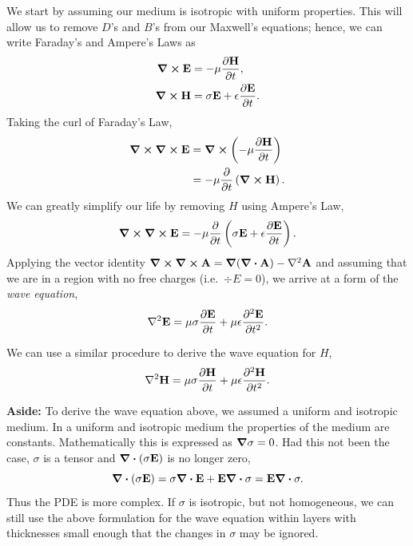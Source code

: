 We start by assuming our medium is isotropic with uniform properties.  This will
allow us to remove $D$'s and $B$'s from our Maxwell's equations; hence, we can
write Faraday's and Ampere's Laws as
\begin{align}
    \curl \vb{E} & = -\mu \pdv{\vb{H}}{t}, \\
    \curl \vb{H} & = \sigma \vb{E} + \epsilon \pdv{\vb{E}}{t}.
\end{align}
Taking the curl of Faraday's Law,
\begin{align*}
    \curl \curl \vb{E} & = \curl \left( -\mu \pdv{\vb{H}}{t} \right) \\
        & = -\mu \pdv{}{t} \left( \curl \vb{H} \right).
\end{align*}
We can greatly simplify our life by removing $H$ using Ampere's Law,
\begin{equation*}
    \curl \curl \vb{E} 
        = - \mu \pdv{}{t} \left( \sigma \vb{E} + \epsilon \pdv{\vb{E}}{t} \right).
\end{equation*}
Applying the vector identity $\curl \curl \vb{A} = \grad (\div \vb{A}) -
\nabla^2 \vb{A}$ and assuming that we are in a region with no free charges
(i.e.\ $\div E = 0$), we arrive at a form of the {\it wave equation},
\begin{equation}
    \nabla^{2} \vb{E} = \mu \sigma \pdv{\vb{E}}{t} + \mu \epsilon \pdv[2]{\vb{E}}{t}.
    \label{eq-Ewave}
\end{equation}

We can use a similar procedure to derive the wave equation for $H$,
\begin{equation}
    \nabla^{2} \vb{H} = \mu \sigma \pdv{\vb{H}}{t} + \mu \epsilon \pdv[2]{\vb{H}}{t}.
    \label{eq-Hwave}
\end{equation}

\begin{framed}
    {\bf Aside:} To derive the wave equation above, we assumed a uniform and
    isotropic medium.  In a uniform and isotropic medium the properties of the
    medium are constants.  Mathematically this is expressed as $\grad \sigma =
    0$.  Had this not been the case, $\sigma$ is a tensor and $\div (\sigma
    \vb{E})$ is no longer zero,
    \begin{equation*}
        \div (\sigma \vb{E}) = \sigma \div \vb{E} + \vb{E} \div{\sigma} =
        \vb{E} \div \sigma.
    \end{equation*}
    Thus the PDE is more complex.  If $\sigma$ is isotropic, but not
    homogeneous, we can still use the above formulation for the wave equation
    within layers with thicknesses small enough that the changes in $\sigma$ may
    be ignored.
\end{framed}


